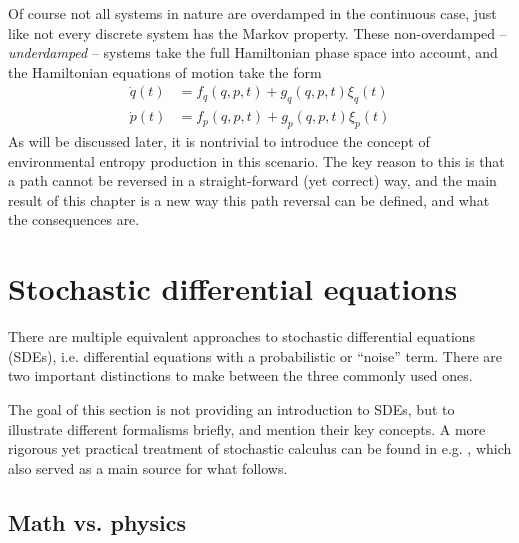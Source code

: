 Of course not all systems in nature are overdamped in the continuous case, just like not every discrete system has the Markov property. These non-overdamped -- \emph{underdamped} -- systems take the full Hamiltonian phase space into account, and the Hamiltonian equations of motion take the form
%
\begin{equation}\begin{split}
	\dot q(t) &= f_q(q,p,t) + g_q(q,p,t)\xi_q(t) \\
	\dot p(t) &= f_p(q,p,t) + g_p(q,p,t)\xi_p(t)
\end{split}\end{equation}
%
As will be discussed later, it is nontrivial to introduce the concept of environmental entropy production in this scenario. The key reason to this is that a path cannot be reversed in a straight-forward (yet correct) way, and the main result of this chapter is a new way this path reversal can be defined, and what the consequences are.







\section{Stochastic differential equations}

There are multiple equivalent approaches to stochastic differential equations (SDEs), i.e. differential equations with a probabilistic or ``noise'' term. There are two important distinctions to make between the three commonly used ones.

The goal of this section is not providing an introduction to SDEs, but to illustrate different formalisms briefly, and mention their key concepts. A more rigorous yet practical treatment of stochastic calculus can be found in e.g. \cite{sde}, which also served as a main source for what follows.

\subsection{Math vs. physics}

